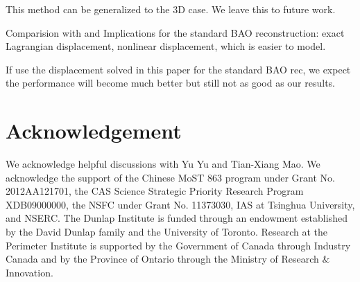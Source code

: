 \documentclass[aps,prd,twocolumn,showpacs,superscriptaddress,groupedaddress,nofootinbib]{revtex4}  %
\begin{document}
This method can be generalized to the 3D case. 
We leave this
to future work.



Comparision with and Implications for the standard BAO reconstruction: exact 
Lagrangian displacement,
nonlinear displacement, which is easier to model.

If use the displacement solved in this paper for the standard BAO rec, we expect
the performance will become much better but still not as good as our results.

\section{Acknowledgement}
We acknowledge helpful discussions with Yu Yu and Tian-Xiang Mao.
We acknowledge the support of the Chinese MoST 863 program under Grant 
No. 2012AA121701, the CAS Science Strategic Priority Research Program 
XDB09000000, the NSFC under Grant No. 11373030, IAS at Tsinghua University, 
 and NSERC.
The Dunlap Institute is funded through an endowment established by the David Dunlap family and the University of Toronto.
Research at the Perimeter Institute is supported by the Government of Canada
through Industry Canada and by the Province of Ontario through the Ministry of
Research $\&$ Innovation.



\end{document}
